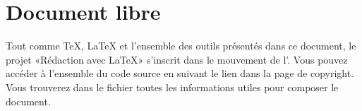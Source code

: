 \section*{Document libre}

Tout comme {\TeX}, {\LaTeX} et l'ensemble des outils présentés dans ce
document, le projet «Rédaction avec {\LaTeX}» s'inscrit dans le
mouvement de
l'. Vous pouvez accéder à l'ensemble du code source en suivant
le lien dans la page de copyright. Vous trouverez dans le fichier
 toutes les informations utiles pour composer le
document.

